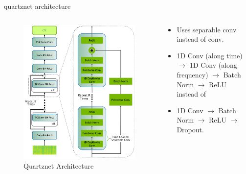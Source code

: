 \documentclass[aspectratio=169,xcolor={dvipsnames,svgnames}]{beamer}
\begin{document}
\begin{frame}[label={sec:quartznet-architecture}]{quartznet architecture}
\begin{columns}
\begin{column}{.4\columnwidth}
\begin{figure}[htbp]
\centering
\includegraphics[width=.9\linewidth]{org-download-images/quartznet/2024-10-18_01-36-10_screenshot.png}
\caption{Quartznet Architecture}
\end{figure}
\end{column}
\begin{column}{.6\columnwidth}
\begin{itemize}
\item Uses \alert{separable} conv instead of conv.
\item 1D Conv (along time) \(\to\) 1D Conv (along frequency)
\(\to\) Batch Norm \(\to\) ReLU \\[0pt]
instead of
\item 1D Conv \(\to\) Batch Norm \(\to\) ReLU \(\to\) Dropout.
\end{itemize}
\end{column}
\end{columns}
\end{frame}
\end{document}
